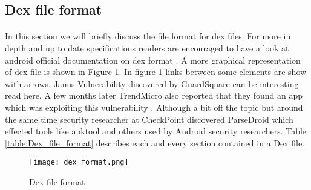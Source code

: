 \documentclass[../main.tex]{subfile}
\begin{document}
			\subsection{Dex file format}
				\paragraph{} In this section we will briefly discuss the file format for dex files. For more in depth and up to date specifications readers are encouraged to have a look at android official documentation on dex format \cite{dex_format}. A more graphical representation of dex file is shown in Figure \ref{fig:dex_format}. In figure \ref{fig:dex_format} links between some elements are show with arrows. Janus Vulnerability \cite{janus_vulnerability} discovered by GuardSquare can be interesting read here. A few months later TrendMicro also reported that they found an app which was exploiting this vulnerability \cite{janus_wild}. Although a bit off the topic but around the same time security researcher at CheckPoint discovered ParseDroid \cite{parsedroid} which effected tools like apktool and others used by Android security researchers. Table \ref{table:Dex_file_format} describes each and every section contained in a Dex file.
				\begin{figure}[H]
					\texttt{[image: dex\_format.png]}
					\caption{Dex file format \cite{dex_image_albertini}}
					\label{fig:dex_format}
				\end{figure}
				
\end{document}

